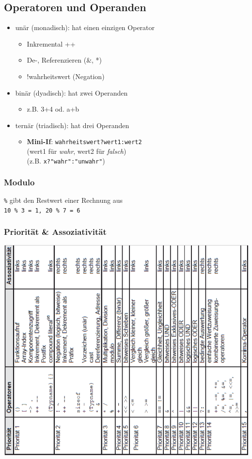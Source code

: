 	\subsection{Operatoren und Operanden}
		\begin{itemize}
			\item unär (monadisch): hat einen einzigen Operator
			\begin{itemize}
				\item Inkremental ++
				\item De-, Referenzieren (\&, *)
				\item !wahrheitswert (Negation)
			\end{itemize}
			\item binär (dyadisch): hat zwei Operanden
			\begin{itemize}
				\item z.B. 3+4 od. a+b
			\end{itemize}
			\item ternär (triadisch): hat drei Operanden
			\begin{itemize}
				\item \textbf{Mini-If}: \verb|wahrheitswert?wert1:wert2|\\
				(wert1 für \textit{wahr}, wert2 für \textit{falsch}) \\
				(z.B. \verb|x?"wahr":"unwahr"|)
			\end{itemize}
		\end{itemize}

		\subsubsection{Modulo}
			\verb|%| gibt den Restwert einer Rechnung aus\\
			\verb|10 % 3 = 1, 20 % 7 = 6|

		\subsubsection{Priorität \& Assoziativität}
			\begin{minipage}{0.8\linewidth}
					\includegraphics[width=1\linewidth]{Bilder/operatoren_prio.png}
			\end{minipage}
			

